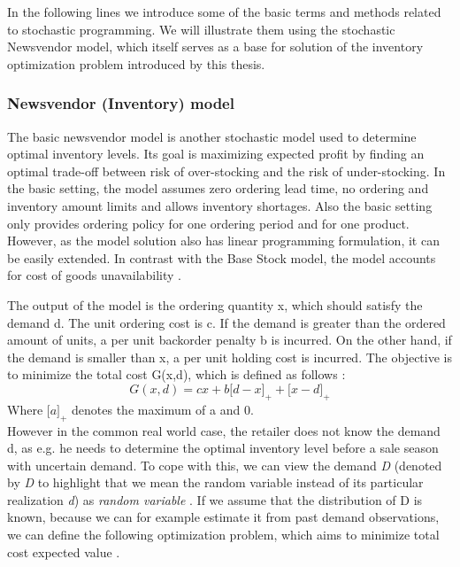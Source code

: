 \documentclass[11pt,a4paper]{article}
\begin{document}
In the following lines we introduce some of the basic terms and methods related to stochastic programming.  We will illustrate them using the stochastic Newsvendor model, which itself serves as a base for solution of the inventory optimization problem introduced by this thesis. 

\subsubsection{Newsvendor (Inventory) model}
\label{sec:nwi}
The basic newsvendor model is another stochastic model used to determine optimal inventory levels. Its goal is maximizing expected profit by finding an optimal trade-off between risk of over-stocking and the risk of under-stocking. In the basic setting, the model assumes zero ordering lead time, no ordering and inventory amount limits and allows inventory shortages. Also the basic setting only provides ordering policy for one ordering period and for one product. However, as the model solution also has linear programming formulation, it can be easily extended. In contrast with the Base Stock model, the model accounts for cost of goods unavailability \cite{supply}.

The output of the model is the ordering quantity x, which should satisfy the demand d. The unit ordering cost is c. If the demand is greater than the ordered amount of units, a per unit backorder penalty b is incurred.  On the other hand, if the demand is smaller than x, a per unit holding cost is incurred. The objective is to minimize the total cost G(x,d), which is defined as follows \cite{sp_tut}:
\begin{equation}
G(x,d)= cx +b\lbrack d - x\rbrack_+ + \lbrack x-d \rbrack_+ 
\end{equation}
Where $\lbrack a \rbrack_+$ denotes the maximum of a and 0. \\
However in the common real world case, the retailer does not know the demand d, as e.g. he needs to determine the optimal inventory level before a sale season with uncertain demand. To cope with this, we can view the demand \textit{D} (denoted by \textit{D} to highlight that we mean the random variable instead of its particular realization \textit{d}) as \textit{random variable} \cite{sp_tut}. If we assume that the distribution of D is known, because we can for example estimate it from past demand observations, we can define the following optimization problem, which aims to minimize total cost expected value \cite{sp_tut}.
\end{document}
